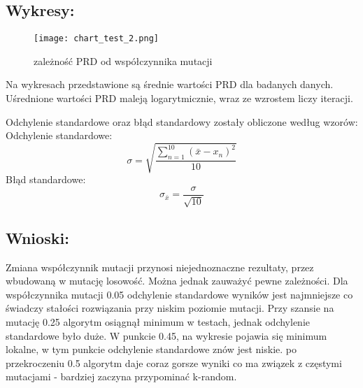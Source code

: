   \subsection{Wykresy: }
    \begin{figure}[H]
      \texttt{[image: chart\_test\_2.png]}
      \centering
      \caption{zależność PRD od współczynnika mutacji}
    \end{figure}
  
    Na wykresach przedstawione są średnie wartości PRD dla badanych danych. Uśrednione wartości PRD maleją logarytmicznie, wraz ze wzrostem liczy iteracji.

    Odchylenie standardowe oraz błąd standardowy zostały obliczone według wzorów: \\
    Odchylenie standardowe:
    \[ \sigma = \sqrt{\frac{\sum_{n = 1}^{10}(\bar{x} - x_n)^2}{10}} \]
    Błąd standardowe:
    \[ \sigma_{\bar{x}} = \frac{\sigma}{\sqrt{10}} \]

  \subsection{Wnioski: }
  Zmiana współczynnik mutacji przynosi niejednoznaczne rezultaty, przez wbudowaną w mutację losowość. Można jednak zauważyć pewne zależności. Dla współczynnika mutacji 0.05 odchylenie standardowe wyników jest najmniejsze co świadczy stałości rozwiązania przy niskim poziomie mutacji. Przy szansie na mutację 0.25 algorytm osiągnął minimum w testach, jednak odchylenie standardowe było duże. W punkcie 0.45, na wykresie pojawia się minimum lokalne, w tym punkcie odchylenie standardowe znów jest niskie. po przekroczeniu 0.5 algorytm daje coraz gorsze wyniki co ma związek z częstymi mutacjami - bardziej zaczyna przypominać k-random.
